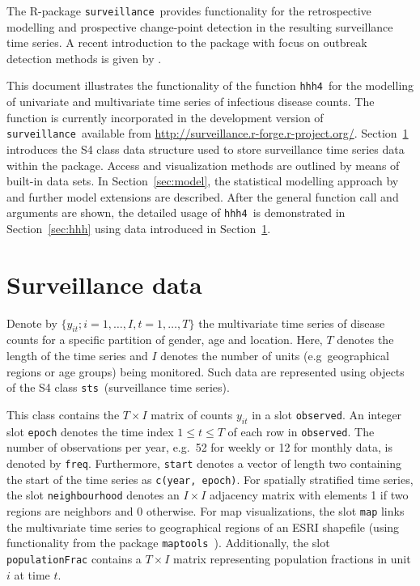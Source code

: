 \documentclass[a4paper,11pt]{article}
\newcommand{\surveillance}{\texttt{surveillance}}
\newcommand{\code}[1]{\texttt{#1}}
\newcommand{\hhh}{\texttt{hhh4}}
\newcommand{\R}{\textsf{R}}
\newcommand{\sts}{\texttt{sts}}
\begin{document}
The \R-package \surveillance\ provides functionality for the retrospective 
modelling and prospective change-point detection in the resulting surveillance 
time series. A recent introduction to the package with focus on outbreak 
detection methods is given by \cite{hoehle-mazick-2010}.

This document illustrates the functionality of the function \hhh\
for the modelling of univariate and multivariate time series 
of infectious disease counts. 
The function is currently incorporated in the development version of 
\surveillance\ available from \url{http://surveillance.r-forge.r-project.org/}.
Section~\ref{sec:data} introduces the S4 class data structure used to store 
surveillance time series data within the package. Access and 
visualization methods are outlined by means of built-in data sets.
In Section~\ref{sec:model}, the statistical modelling approach by 
\cite{held-etal-2005} and further model extensions are described. 
After the general function call and arguments 
are shown, the detailed usage of \hhh\ is demonstrated in 
Section~\ref{sec:hhh} using data introduced in Section~\ref{sec:data}. 

\section{Surveillance data}\label{sec:data}

Denote by $\{y_{it}; i=1,\ldots,I,t=1,\ldots,T\}$ the multivariate time series
of disease counts for a specific partition of gender, age and location. 
Here, $T$ denotes the length of the time series and $I$ denotes the number 
of units (e.g\ geographical regions or age groups) being monitored.
Such data are represented using objects of the S4 class \sts\ (surveillance 
time series).

This class contains the $T\times I$ matrix of counts $y_{it}$ in
a slot \code{observed}. An integer slot \code{epoch} denotes the time index
$1\leq t \leq T$ of each row in \code{observed}. The number of observations
per year, e.g.\ 52 for weekly or 12 for monthly data, is denoted by \code{freq}.
Furthermore, \code{start} denotes a vector of length two containing the start
of the time series as \code{c(year, epoch)}.
For spatially stratified time series, the slot \code{neighbourhood}
denotes an $I \times I$ adjacency matrix with elements 1 if two regions are
neighbors and 0 otherwise. For map visualizations, the slot \code{map} 
links the multivariate time series to geographical regions of an ESRI shapefile
(using functionality from the package \code{maptools}~\citep{maptools}).
Additionally, the slot \code{populationFrac} contains a $T\times I$ matrix
representing population fractions in unit $i$ at time $t$.
\end{document}
